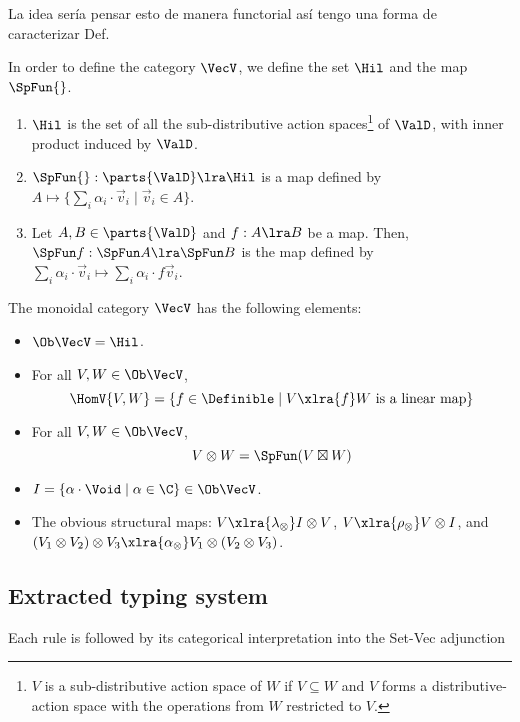 {\color{red} La idea sería pensar esto de manera functorial así tengo una forma de caracterizar Def.}

In order to define the category $\VecV$, we define the set $\Hil$ and the map $\SpFun{}$.
\begin{definition}\label{def:functors}\leavevmode
  \begin{enumerate}
  \item $\Hil$ is the set of all the sub-distributive action spaces\footnote{$V$ is a
      sub-distributive action space of $W$ if $V\subseteq W$ and $V$ forms a distributive-action space
      with the operations from $W$ restricted to $V$.} of $\ValD$, with inner
    product induced by $\ValD$.
  \item $\SpFun{}:\parts{\ValD}\lra\Hil$ is a map defined by
    $A\mapsto\{\sum_i\alpha_i\cdot\vec v_i\mid\vec v_i\in A\}$.
  \item Let $A,B\in\parts{\ValD}$ and $f:A\lra B$ be a map. Then, $\SpFun f:\SpFun
    A\lra\SpFun B$ is the map defined by $\sum_i\alpha_i\cdot\vec v_i\mapsto\sum_i\alpha_i\cdot f\vec v_i$.
  \end{enumerate}
\end{definition}

\begin{definition}\label{def:VecV}
  The monoidal category $\VecV$ has the following elements:
  \begin{itemize}
  \item $\Ob\VecV = \Hil$.
  \item For all $V, W\in\Ob\VecV$,
    \[
      \HomV{V,W}=\{f\in\Definible\mid V\xlra{f} W\textrm{ is a linear map}\}
    \]
  \item For all $V,W\in\Ob\VecV$,
    \[
      V\otimes W=\SpFun(V\boxtimes W)
    \]
  \item $I= \{\alpha\cdot\Void\mid\alpha\in\C\}\in\Ob\VecV$.
  \item The obvious structural maps:
    $V\xlra{\lambda_\otimes}I\otimes V$,
    $V\xlra{\rho_\otimes}V\otimes I$, and
    $(V_1\otimes V_2)\otimes V_3\xlra{\alpha_\otimes}V_1\otimes (V_2\otimes V_3)$.
  \end{itemize}
\end{definition}

\newpage
\subsection{Extracted typing system}
Each rule is followed by its categorical interpretation into the Set-Vec adjunction

